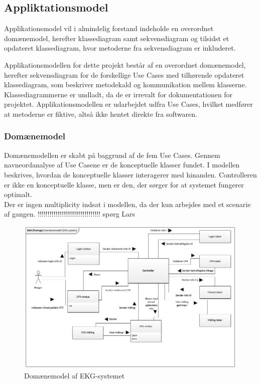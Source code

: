 \subsection{Appliktationsmodel}
Applikationsmodel vil i almindelig forstand indeholde en overordnet domænemodel, herefter klassediagram samt sekvensdiagram og tilsidst et opdateret klassediagram, hvor metoderne fra sekvensdiagram er inkluderet. 

Applikationsmodellen for dette projekt består af en overordnet domænemodel, herefter sekvensdiagram for de forskellige Use Cases med tilhørende opdateret klassediagram, som beskriver metodekald og kommunikation mellem klasserne. Klassediagrammerne er undladt, da de er irrevalt for dokumentationen for projektet. Applikationsmodellen er udarbejdet udfra Use Cases, hvilket medfører at metoderne er fiktive, altså ikke hentet direkte fra softwaren.  

\subsubsection{Domænemodel}
Domænemodellen er skabt på baggrund af de fem Use Cases. Gennem navneordanalyse af Use Casene er de konceptuelle klasser fundet. I modellen beskrives, hvordan de konceptuelle klasser interagerer med hinanden. Controlleren er ikke en konceptuelle klasse, men er den, der sørger for at systemet fungerer optimalt.
\\
Der er ingen multiplicity indsat i modellen, da der kun arbejdes med et scenarie af gangen. !!!!!!!!!!!!!!!!!!!!!!!!!!!!!!!! spørg Lars 

\begin{figure}[H]
	\centering
	\includegraphics[width=1\textwidth]{Figurer/Snip20150429_37}
	\caption{Domænemodel af EKG-systemet}
\end{figure}

